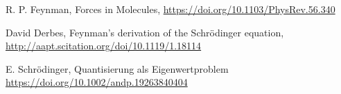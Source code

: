 \item
  R. P. Feynman,
  Forces in Molecules,
  \url{https://doi.org/10.1103/PhysRev.56.340}
\item
  David Derbes,
  Feynman’s derivation of the Schrödinger equation,
  \url{http://aapt.scitation.org/doi/10.1119/1.18114}
\item
  E. Schrödinger,
  Quantisierung als Eigenwertproblem
  \url{https://doi.org/10.1002/andp.19263840404}

